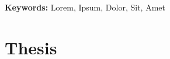 \documentclass[openany,g5paper,electronic]{kthesis}
\begin{document}


\emergencystretch=10pt
\maketitle

\frontmatter %
\begin{abstract}
\noindent \lipsum[1]

\end{abstract}

\bigskip \bigskip \bigskip \bigskip \bigskip

\setlength{\leftskip}{0.3 cm} \textbf {Keywords:} Lorem, Ipsum, Dolor, Sit, Amet

\newpage
{}
\begin{abstract}
\noindent \lipsum[1]
\end{abstract}





\mainmatter %
\tableofcontents
\part{Thesis}
\clearpage






%


\renewcommand{\bibname}{References}%


\printindex
\end{document}
